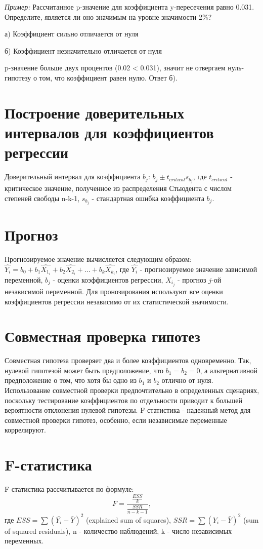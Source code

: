 \textit{Пример:} Рассчитанное p-значение для коэффициента y-пересечения равно 0.031. Определите, является ли оно значимым на уровне значимости 2\%?

а) Коэффициент сильно отличается от нуля

б) Коэффициент незначительно отличается от нуля

p-значение больше двух процентов (0.02 < 0.031), значит не отвергаем нуль-гипотезу о том, что коэффициент равен нулю. Ответ б).
\section{Построение доверительных интервалов для коэффициентов регрессии}
\hspace*{\parindent}
Доверительный интервал для коэффициента $b_j$: $b_j \pm t_{critical}s_{b_{j}}$, где $t_{critical}$ - критическое значение, полученное из распределения Стьюдента с числом степеней свободы
n-k-1, $s_{b_{j}}$ - стандартная ошибка коэффициента $b_j$.
\section{Прогноз}
\hspace*{\parindent}
Прогнозируемое значение вычисляется следующим образом: $\hat{Y_i} = b_0 + b_1\hat{X_1_i} + b_2\hat{X_2_i} + ... + b_k\hat{X_k_i}$, где $\hat{Y_i}$ - прогнозируемое значение зависимой переменной, $b_j$ - оценки коэффициентов регрессии, $X_i_j$ - прогноз $j$-ой независимой переменной. Для пронозирования используют все оценки коэффициентов регрессии независимо от их статистической значимости.
\section{Совместная проверка гипотез}
\hspace*{\parindent}
Совместная гипотеза проверяет два и более коэффициентов одновременно. Так, нулевой гипотезой может быть предположение, что $b_1=b_2=0$, а альтернативной предположение  о том, что хотя бы одно из $b_1$ и $b_2$ отлично от нуля. Использование совместной проверки предпочтительно в определенных сценариях, поскольку тестирование коэффициентов по отдельности приводит к большей вероятности отклонения нулевой гипотезы. F-статистика - надежный метод для совместной проверки гипотез, особенно, если независимые переменные коррелируют.
\section{F-статистика}
\hspace*{\parindent}
F-статистика рассчитывается по формуле:
$$F = \frac{\frac{ESS}{k}}{\frac{SSR}{n-k-1}},$$ где $ESS = \sum(\bar{Y_i} - \bar{Y})^2$ (explained sum of squares), $SSR = \sum(Y_i - \bar{Y})^2$ (sum of squared residuals), n - количество наблюдений, k - число независимых переменных.

